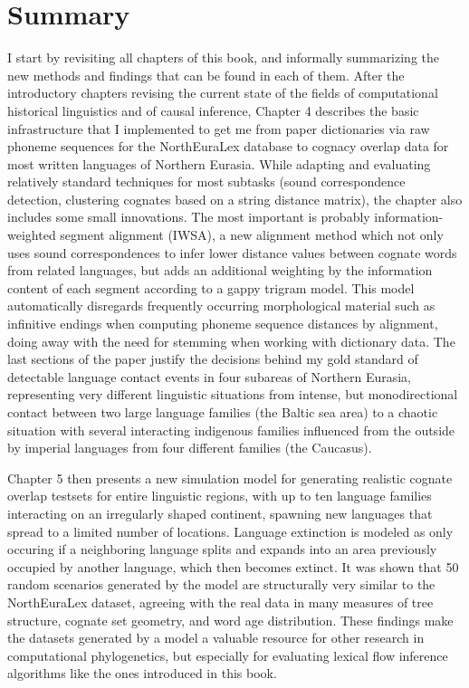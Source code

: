 \section{Summary}
I start by revisiting all chapters of this book, and informally summarizing the new methods and findings that can be found in each of them. After the introductory chapters revising the current state of the fields of computational historical linguistics and of causal inference, Chapter 4 describes the basic infrastructure that I implemented to get me from paper dictionaries via raw phoneme sequences for the NorthEuraLex database to cognacy overlap data for most written languages of Northern Eurasia. While adapting and evaluating relatively standard techniques for most subtasks (sound correspondence detection, clustering cognates based on a string distance matrix), the chapter also includes some small innovations. The most important is probably information-weighted segment alignment (IWSA), a new alignment method which not only uses sound correspondences to infer lower distance values between cognate words from related languages, but adds an additional weighting by the information content of each segment according to a gappy trigram model. This model automatically disregards frequently occurring morphological material such as infinitive endings when computing phoneme sequence distances by alignment, doing away with the need for stemming when working with dictionary data. The last sections of the paper justify the decisions behind my gold standard of detectable language contact events in four subareas of Northern Eurasia, representing very different linguistic situations from intense, but monodirectional contact between two large language families (the Baltic sea area) to a chaotic situation with several interacting indigenous families influenced from the outside by imperial languages from four different families (the Caucasus).

Chapter 5 then presents a new simulation model for generating realistic cognate overlap testsets for entire linguistic regions, with up to ten language families interacting on an irregularly shaped continent, spawning new languages that spread to a limited number of locations. Language extinction is modeled as only occuring if a neighboring language splits and expands into an area previously occupied by another language, which then becomes extinct. It was shown that 50 random scenarios generated by the model are structurally very similar to the NorthEuraLex dataset, agreeing with the real data in many measures of tree structure, cognate set geometry, and word age distribution. These findings make the datasets generated by a model a valuable resource for other research in computational phylogenetics, but especially for evaluating lexical flow inference algorithms like the ones introduced in this book.

